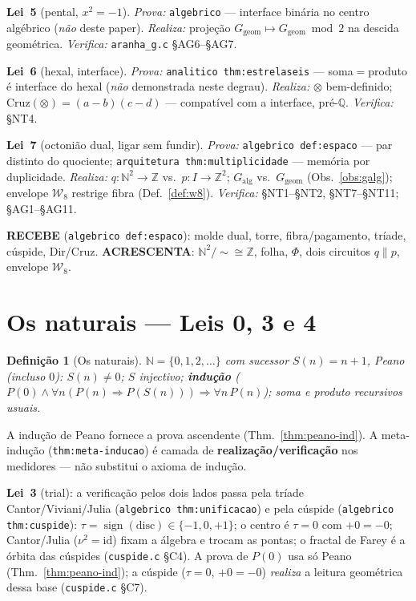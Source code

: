 \documentclass[11pt,a4paper]{article}
\newtheorem{definicao}{Definição}
\newcommand{\code}[1]{\texttt{\small #1}}
\newcommand{\Word}{\mathcal{W}}
\begin{document}
\medskip\noindent\textbf{Lei~5} (pental, $x^{2}=-1$).
\emph{Prova:} \code{algebrico} --- interface binária no centro algébrico
(\emph{não} deste paper).
\emph{Realiza:} projeção $G_{\mathrm{geom}}\mapsto G_{\mathrm{geom}}\bmod2$
na descida geométrica.
\emph{Verifica:} \code{aranha\_g.c} §AG6--§AG7.

\medskip\noindent\textbf{Lei~6} (hexal, interface).
\emph{Prova:} \code{analitico thm:estrelaseis} --- soma$=$produto é
interface do hexal (\emph{não} demonstrada neste degrau).
\emph{Realiza:} $\otimes$ bem-definido; $\mathrm{Cruz}(\otimes)=(a-b)(c-d)$
--- compatível com a interface, pré-$\mathbb{Q}$.
\emph{Verifica:} §NT4.

\medskip\noindent\textbf{Lei~7} (octonião dual, ligar sem fundir).
\emph{Prova:} \code{algebrico def:espaco} --- par distinto do quociente;
\code{arquitetura thm:multiplicidade} --- memória por duplicidade.
\emph{Realiza:} $q\colon\mathbb{N}^{2}\to\mathbb{Z}$ vs.\
$p\colon I\to\mathbb{Z}^{2}$; $G_{\mathrm{alg}}$ vs.\ $G_{\mathrm{geom}}$
(Obs.~\ref{obs:galg}); envelope $\Word_8$ restrige fibra (Def.~\ref{def:w8}).
\emph{Verifica:} §NT1--§NT2, §NT7--§NT11; §AG1--§AG11.

\medskip\noindent\textbf{RECEBE} (\code{algebrico def:espaco}): molde dual,
torre, fibra/pagamento, tríade, cúspide, Dir/Cruz.
\textbf{ACRESCENTA}: $\mathbb{N}^{2}/{\sim}\cong\mathbb{Z}$, folha, $\Phi$,
dois circuitos $q\parallel p$, envelope $\Word_8$.

\section{Os naturais --- Leis 0, 3 e 4}\label{sec:peano}

\begin{definicao}[Os naturais]\label{def:peano}
$\mathbb{N}=\{0,1,2,\ldots\}$ com sucessor $S(n)=n+1$, Peano (incluso $0$):
$S(n)\neq0$; $S$ injectivo; \textbf{indução}
($P(0)\wedge\forall n(P(n)\Rightarrow P(S(n)))\Rightarrow\forall n\,P(n)$);
soma e produto recursivos usuais.
\end{definicao}

A indução de Peano fornece a prova ascendente (Thm.~\ref{thm:peano-ind}).
A meta-indução (\code{thm:meta-inducao}) é camada de \textbf{realização/verificação}
nos medidores --- não substitui o axioma de indução.

\noindent\textbf{Lei~3} (trial): a verificação pelos dois lados passa pela
tríade Cantor/Viviani/Julia (\code{algebrico thm:unificacao}) e pela
cúspide (\code{algebrico thm:cuspide}): $\tau=\operatorname{sign}(\mathrm{disc})
\in\{-1,0,+1\}$; o centro é $\tau=0$ com $+0=-0$; Cantor/Julia
($\nu^{2}=\mathrm{id}$) fixam a álgebra e trocam as pontas; o fractal de
Farey é a órbita das cúspides (\code{cuspide.c} §C4). A prova de $P(0)$
usa só Peano (Thm.~\ref{thm:peano-ind}); a cúspide ($\tau=0$, $+0=-0$)
\emph{realiza} a leitura geométrica dessa base (\code{cuspide.c} §C7).
\end{document}
